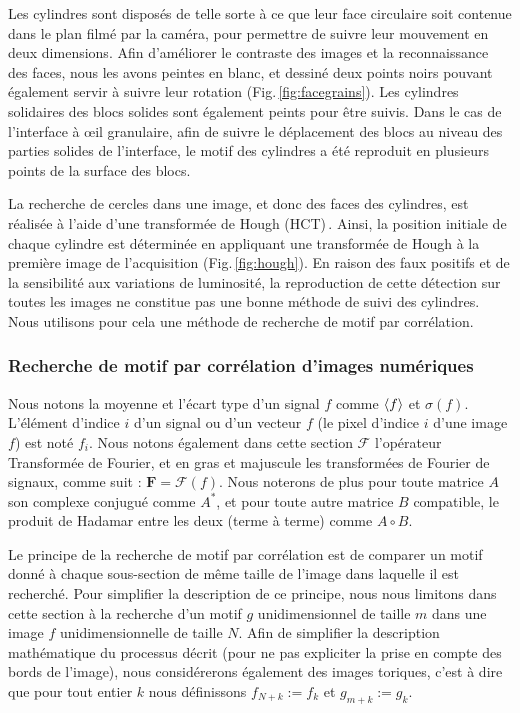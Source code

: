 Les cylindres sont disposés de telle sorte à ce que leur face circulaire soit contenue dans le plan filmé par la caméra, pour permettre de suivre leur mouvement en deux dimensions. Afin d'améliorer le contraste des images et la reconnaissance des faces, nous les avons peintes en blanc, et dessiné deux points noirs pouvant également servir à suivre leur rotation (Fig.\,\ref{fig:facegrains}). Les cylindres solidaires des blocs solides sont également peints pour être suivis. Dans le cas de l'interface à œil granulaire, afin de suivre le déplacement des blocs au niveau des parties solides de l'interface, le motif des cylindres a été reproduit en plusieurs points de la surface des blocs.


La recherche de cercles dans une image, et donc des faces des cylindres, est réalisée à l'aide d'une transformée de Hough (HCT)\,\cite{illingworth_survey_1988}. Ainsi, la position initiale de chaque cylindre est déterminée en appliquant une transformée de Hough à la première image de l'acquisition (Fig.\,\ref{fig:hough}). En raison des faux positifs et de la sensibilité aux variations de luminosité, la reproduction de cette détection sur toutes les images ne constitue pas une bonne méthode de suivi des cylindres. Nous utilisons pour cela une méthode de recherche de motif par corrélation.



\subsubsection{Recherche de motif par corrélation d'images numériques}

Nous notons la moyenne et l'écart type d'un signal $f$ comme $\left\langle {f} \right\rangle$ et $\sigma(f)$. L'élément d'indice $i$ d'un signal ou d'un vecteur $f$ (le pixel d'indice $i$ d'une image $f$) est noté $f_i$. Nous notons également dans cette section $\mathcal{F}$ l'opérateur Transformée de Fourier, et en gras et majuscule les transformées de Fourier de signaux, comme suit : $\mathbf{F} = \mathcal{F}(f)$. Nous noterons de plus pour toute matrice $A$ son complexe conjugué comme $A^*$, et pour toute autre matrice $B$ compatible, le produit de Hadamar entre les deux (terme à terme) comme $A\circ B$.


Le principe de la recherche de motif par corrélation est de comparer un motif donné à chaque sous-section de même taille de l'image dans laquelle il est recherché. Pour simplifier la description de ce principe, nous nous limitons dans cette section à la recherche d'un motif $g$ unidimensionnel de taille $m$ dans une image $f$ unidimensionnelle de taille $N$. Afin de simplifier la description mathématique du processus décrit (pour ne pas expliciter la prise en compte des bords de l'image), nous considérerons également des images toriques, c'est à dire que pour tout entier $k$ nous définissons $f_{N+k}:=f_{k}$ et $g_{m+k}:=g_{k}$.

